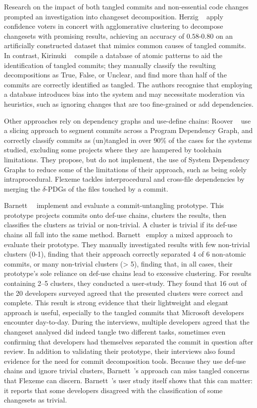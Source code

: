 Research on the impact of both tangled commits and non-essential code changes
prompted an investigation into changeset decomposition. Herzig
\etal~\cite{Herzig2013, Herzig2016} apply confidence voters in concert with
agglomerative clustering to decompose changesets with promising results,
achieving an accuracy of $0.58$-$0.80$ on an artificially constructed dataset
that mimics common causes of tangled commits. In contrast, Kirinuki
\etal~\cite{Kirinuki2014, Kirinuki2017} compile a database of atomic patterns to
aid the identification of tangled commits; they manually classify the resulting
decompositions as True, False, or Unclear, and find more than half of the
commits are correctly identified as tangled. The authors recognise that
employing a database introduces bias into the system and may necessitate
moderation via heuristics, such as ignoring changes that are too fine-grained or
add dependencies.

Other approaches rely on dependency graphs and use-define chains: Roover
\etal~\cite{Roover2017} use a slicing approach to segment commits across a
Program Dependency Graph, and correctly classify commits as (un)tangled in over
90\% of the cases for the systems studied, excluding some projects where they
are hampered by toolchain limitations. They propose, but do not implement, the
use of System Dependency Graphs to reduce some of the limitations of their
approach, such as being solely intraprocedural. Flexeme tackles interprocedural
and cross-file dependencies by merging the $\delta$-PDGs of the files touched by
a commit.  

Barnett~\etal~\cite{Barnett2015} implement and evaluate a commit-untangling
prototype. This prototype projects commits onto def-use chains, clusters the
results, then classifies the clusters as trivial or non-trivial. A cluster is
trivial if its def-use chains all fall into the same method. Barnett~\etal
employ a mixed approach to evaluate their prototype. They manually investigated
results with few non-trivial clusters (0-1), finding that their approach
correctly separated 4 of 6 non-atomic commits,  or many non-trivial clusters (>
5), finding that, in all cases, their prototype's sole reliance on def-use
chains lead to excessive clustering. For results containing 2--5 clusters, they
conducted a user-study. They found that 16 out of the 20 developers surveyed
agreed that the presented clusters were correct and complete. This result is
strong evidence that their lightweight and elegant approach is useful,
especially to the tangled commits that Microsoft developers encounter
day-to-day. During the interviews, multiple developers agreed that the changeset
analysed did indeed tangle two different tasks, sometimes even confirming that
developers had themselves separated the commit in question after review. In
addition to validating their prototype, their interviews also found evidence for
the need for commit decomposition tools. Because they use def-use chains and
ignore trivial clusters, Barnett~\etal's approach can miss tangled concerns that
Flexeme can discern. Barnett~\etal's user study itself shows that this can
matter: it reports that some developers disagreed with the classification of
some changesets as trivial.

